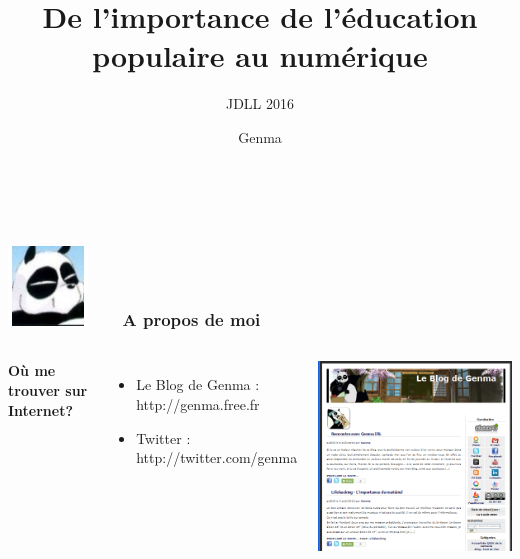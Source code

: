 \documentclass{beamer}
\title[De l'importance de l'éducation populaire au numérique]{De l'importance de l'éducation populaire au numérique}
\author{JDLL 2016}
\author{Genma}
\begin{document}
\begin{frame}
	\titlepage
	\vfill
	\begin{center}
		\\[2.5ex]
		{\tiny\CcNote{\CcLongnameByNcSa}}
		\vspace*{-2.5ex}
	\end{center}
\end{frame}

\begin{frame}
\frametitle{\includegraphics[scale=0.4]{./images/Genma.jpg} \ \ \  A propos de moi  }
\begin{columns}[c] 
\textbf{Où me trouver sur Internet?}
\begin{itemize}
\item Le Blog de Genma : http://genma.free.fr
\item Twitter : http://twitter.com/genma
\end{itemize}
\includegraphics[scale=0.40] {./images/blog.png} 
\end{columns}
\end{frame}
\end{document}
